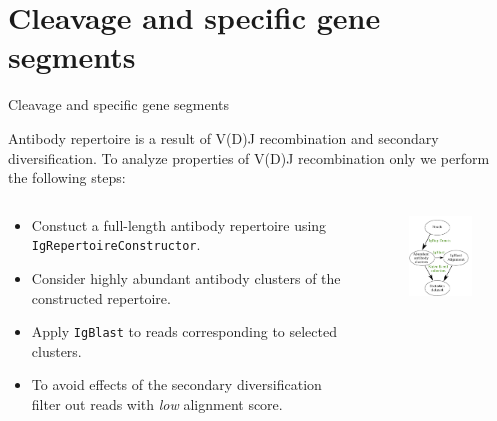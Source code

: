 \documentclass{beamer}\usepackage[]{graphicx}\usepackage[]{color}
\begin{document}
\section{Cleavage and specific gene segments}
\begin{frame}{Cleavage and specific gene segments}

Antibody repertoire is a result of V(D)J recombination and secondary diversification. To analyze properties of V(D)J recombination only we perform the following steps:
 
  \pause
  \bigskip 
  \small{
  \begin{columns}[T]
    \begin{column}{0.6\textwidth}
      \begin{itemize}
        \item Constuct a full-length antibody repertoire using \texttt{IgRepertoireConstructor}.
        \item Consider {\color{blue} highly abundant antibody clusters} of the constructed repertoire.
        \item Apply \texttt{IgBlast} to reads corresponding to selected clusters.
        \item To avoid effects of the secondary diversification filter out reads with \textit{low} alignment score.
      \end{itemize}
    \end{column}
    \begin{column}{0.5\textwidth}
      \begin{figure}[h]
        \includegraphics[width=120pt]{Pictures/downsampling.pdf}
      \end{figure}
    \end{column}
  \end{columns}
  }
\end{frame}
\end{document}
